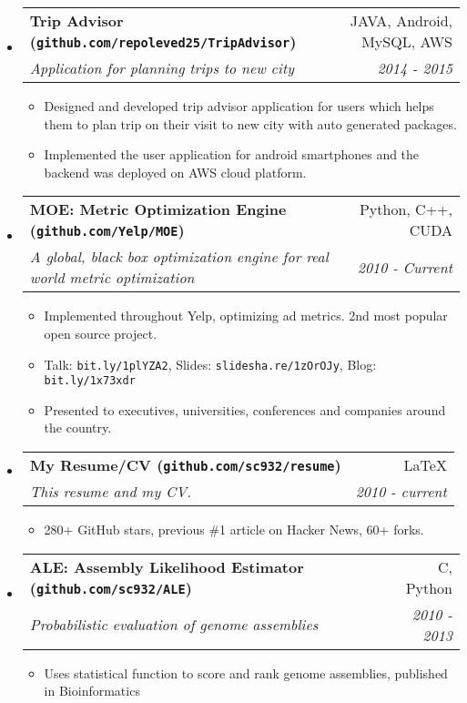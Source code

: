 \documentclass[letterpaper,11pt]{article}
\makeatletter
\newcommand{\resitem}[1]{\item #1 \vspace{-2pt}}
\newcommand{\ressubheading}[4]{
\begin{tabular*}{6.5in}{l@{\cftdotfill{\cftsecdotsep}\extracolsep{\fill}}r}
		\textbf{#1} & #2 \\
		\textit{#3} & \textit{#4} \\
\end{tabular*}\vspace{-6pt}}
\makeatother
\begin{document}
\begin{itemize}

\item
    \ressubheading{Trip Advisor (\texttt{github.com/repoleved25/TripAdvisor})}{JAVA, Android, MySQL, AWS}{Application for planning trips to new city}{2014 - 2015}
    \begin{itemize}
        \resitem{Designed and developed trip advisor application for users which helps them to plan trip on their visit to new city with auto generated packages.}
	\resitem{Implemented the user application for android smartphones and the backend was deployed on AWS cloud platform.}
        \end{itemize}

\item
    \ressubheading{MOE: Metric Optimization Engine (\texttt{github.com/Yelp/MOE})}{Python, C++, CUDA}{A global, black box optimization engine for real world metric optimization}{2010 - Current}
    \begin{itemize}
        \resitem{Implemented throughout Yelp, optimizing ad metrics. 2nd most popular open source project.}
        \resitem{Talk: \texttt{bit.ly/1plYZA2}, Slides: \texttt{slidesha.re/1zOrOJy}, Blog: \texttt{bit.ly/1x73xdr}}
        \resitem{Presented to executives, universities, conferences and companies around the country.}
	\end{itemize}

\item
    \ressubheading{My Resume/CV (\texttt{github.com/sc932/resume})}{\LaTeX}{This resume and my CV.}{2010 - current}
    \begin{itemize}
        \resitem{280+ GitHub stars, previous \#1 article on Hacker News, 60+ forks.}
	\end{itemize}

\item
    \ressubheading{ALE: Assembly Likelihood Estimator (\texttt{github.com/sc932/ALE})}{C, Python}{Probabilistic evaluation of genome assemblies}{2010 - 2013}
    \begin{itemize}
        \resitem{Uses statistical function to score and rank genome assemblies, published in Bioinformatics}
	\end{itemize}

\end{itemize}
\end{document}
